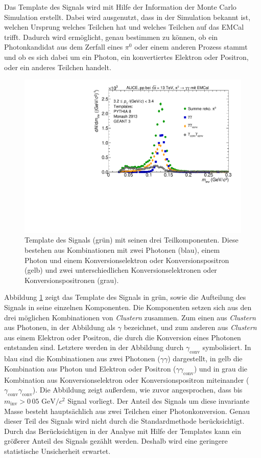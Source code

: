 Das Template des Signals wird mit Hilfe der Information der Monte Carlo Simulation erstellt.
Dabei wird ausgenutzt, dass in der Simulation bekannt ist, welchen Ursprung welches Teilchen hat und welches Teilchen auf das EMCal trifft.
Dadurch wird ermöglicht, genau bestimmen zu können, ob ein Photonkandidat aus dem Zerfall eines $\pi^{0}$ oder einem anderen Prozess stammt und ob es sich dabei um ein Photon, ein konvertiertes Elektron oder Positron, oder ein anderes Teilchen handelt.
\begin{figure}[tp]
\centering
\includegraphics[width=.75\linewidth]{PeakTemplateMotivation10_Data_2016.pdf}
\caption{Template des Signals (grün) mit seinen drei Teilkomponenten.
Diese bestehen aus Kombinationen mit zwei Photonen (blau), einem Photon und einem Konversionselektron oder Konversionspositron (gelb) und zwei unterschiedlichen Konversionselektronen oder Konversionspositronen (grau).}
\label{fig:SigTemp}
\end{figure}
\newline
Abbildung \ref{fig:SigTemp} zeigt das Template des Signals in grün, sowie die Aufteilung des Signals in seine einzelnen Komponenten.
Die Komponenten setzen sich aus den drei möglichen Kombinationen von \textit{Clustern} zusammen.
Zum einen aus \textit{Clustern} aus Photonen, in der Abbildung als $\gamma$ bezeichnet, und zum anderen aus \textit{Clustern} aus einem Elektron oder Positron, die durch die Konversion  eines Photonen entstanden sind.
Letztere werden in der Abbildung durch $\gamma_\text{conv}$ symbolisiert.
\newline
In blau sind die Kombinationen aus zwei Photonen ($\gamma\gamma$) dargestellt, in gelb die Kombination aus Photon und Elektron oder Positron ($\gamma\gamma_\text{conv}$) und in grau die Kombination aus Konversionselektron oder Konversionspositron miteinander ($\gamma_\text{conv}\gamma_\text{conv}$).
\newline
Die Abbildung zeigt außerdem, wie zuvor angesprochen, dass bis $m_\text{inv}>0\,05 \text{ GeV}/c^{2}$ Signal vorliegt.
Der Anteil des Signals um diese invariante Masse besteht hauptsächlich aus zwei Teilchen einer Photonkonversion.
Genau dieser Teil des Signals wird nicht durch die Standardmethode berücksichtigt.
Durch das Berücksichtigen in der Analyse mit Hilfe der Templates kann ein größerer Anteil des Signals gezählt werden.
Deshalb wird eine geringere statistische Unsicherheit erwartet.